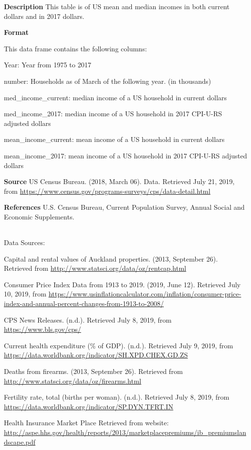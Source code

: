 \documentclass[]{book}
\begin{document}
\textbf{Description}
This table is of US mean and median incomes in both current dollars and in 2017 dollars.

\textbf{Format}

This data frame contains the following columns:

Year: Year from 1975 to 2017

number: Households as of March of the following year. (in thousands)

med\_income\_current: median income of a US household in current dollars

med\_income\_2017: median income of a US household in 2017 CPI-U-RS adjusted dollars

mean\_income\_current: mean income of a US household in current dollars

mean\_income\_2017: mean income of a US household in 2017 CPI-U-RS adjusted dollars

\textbf{Source}
US Census Bureau. (2018, March 06). Data. Retrieved July 21, 2019, from \url{https://www.census.gov/programs-surveys/cps/data-detail.html}

\textbf{References}
U.S. Census Bureau, Current Population Survey, Annual Social and Economic Supplements.

\textbf{\\
}
Data Sources:

Capital and rental values of Auckland properties. (2013, September 26). Retrieved from
\url{http://www.statsci.org/data/oz/rentcap.html}

Consumer Price Index Data from 1913 to 2019. (2019, June 12). Retrieved July 10, 2019, from \url{https://www.usinflationcalculator.com/inflation/consumer-price-index-and-annual-percent-changes-from-1913-to-2008/}

CPS News Releases. (n.d.). Retrieved July 8, 2019, from \url{https://www.bls.gov/cps/}

Current health expenditure (\% of GDP). (n.d.). Retrieved July 9, 2019, from \url{https://data.worldbank.org/indicator/SH.XPD.CHEX.GD.ZS}

Deaths from firearms. (2013, September 26). Retrieved from
\url{http://www.statsci.org/data/oz/firearms.html}

Fertility rate, total (births per woman). (n.d.). Retrieved July 8, 2019, from \url{https://data.worldbank.org/indicator/SP.DYN.TFRT.IN}

Health Insurance Market Place Retrieved from website:
\url{http://aspe.hhs.gov/health/reports/2013/marketplacepremiums/ib_premiumslandscape.pdf}
\end{document}
